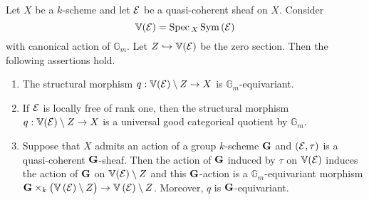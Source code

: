 \begin{theorem}\label{theorem:actions_of_vector_bundles_with_linearization}
Let $X$ be a $k$-scheme and let ${\mathcal E}$ be a quasi-coherent sheaf on $X$. Consider 
$$\mathbb{V}({\mathcal E}) = \mathrm{Spec}\,_X\,\textrm{Sym}\left({\mathcal E}\right)$$
with canonical action of $\mathbb{G}_m$. Let $Z\hookrightarrow \mathbb{V}({\mathcal E})$ be the zero section. Then the following assertions hold.
\begin{enumerate}[label=\emph{\textbf{(\arabic*)}}, leftmargin=3.0em]
\item The structural morphism $q:\mathbb{V}({\mathcal E})\setminus Z\rightarrow X$ is $\mathbb{G}_m$-equivariant.
\item If ${\mathcal E}$ is locally free of rank one, then the structural morphism $q:\mathbb{V}({\mathcal E})\setminus Z\rightarrow X$ is a universal good categorical quotient by $\mathbb{G}_m$.
\item Suppose that $X$ admits an action of a group $k$-scheme $\mathbf{G}$ and $({\mathcal E},\tau)$ is a quasi-coherent $\mathbf{G}$-sheaf. Then the action of $\mathbf{G}$ induced by $\tau$ on $\mathbb{V}({\mathcal E})$ induces the action of $\mathbf{G}$ on $\mathbb{V}({\mathcal E})\setminus Z$ and this $\mathbf{G}$-action is a $\mathbb{G}_m$-equivariant morphism $\mathbf{G}\times_k\big(\mathbb{V}\left({\mathcal E}\right)\setminus Z\big)\rightarrow \mathbb{V}\left({\mathcal E}\right)\setminus Z$. Moreover, $q$ is $\mathbf{G}$-equivariant.
\end{enumerate}
\end{theorem}
